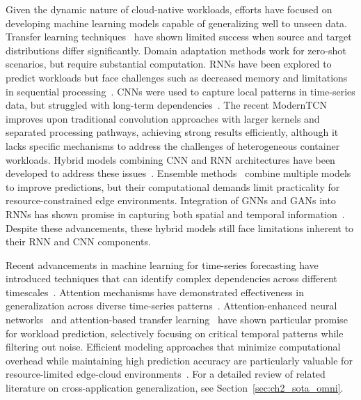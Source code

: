Given the dynamic nature of cloud-native workloads, efforts have focused on developing machine learning models capable of generalizing well to unseen data. Transfer learning techniques~\cite{wang2019transfer} have shown limited success when source and target distributions differ significantly. Domain adaptation methods work for zero-shot scenarios, but require substantial computation. \acp{RNN} have been explored to predict workloads but face challenges such as decreased memory and limitations in sequential processing~\cite{hochreiter1998vanishing, benidis2022deep}. \acp{CNN} were used to capture local patterns in time-series data, but struggled with long-term dependencies~\cite{acmtimeseriesreview2024}. The recent \ac{ModernTCN}~\cite{ModernTCN} improves upon traditional convolution approaches with larger kernels and separated processing pathways, achieving strong results efficiently, although it lacks specific mechanisms to address the challenges of heterogeneous container workloads. Hybrid models combining \ac{CNN} and \ac{RNN} architectures have been developed to address these issues~\cite{xu2022esdnn}. Ensemble methods~\cite{kim2024ensemble} combine multiple models to improve predictions, but their computational demands limit practicality for resource-constrained edge environments. Integration of \acp{GNN} and \acp{GAN} into \acp{RNN} has shown promise in capturing both spatial and temporal information~\cite{li2024evogwp, esteban2017real, AGCRN}. Despite these advancements, these hybrid models still face limitations inherent to their \ac{RNN} and \ac{CNN} components.

Recent advancements in machine learning for time-series forecasting have introduced techniques that can identify complex dependencies across different timescales~\cite{gort2024forecasting}. Attention mechanisms have demonstrated effectiveness in generalization across diverse time-series patterns~\cite{vaswani2017attention, wen2022transformers}. Attention-enhanced neural networks~\cite{zhang2022attention} and attention-based transfer learning~\cite{li2022robust} have shown particular promise for workload prediction, selectively focusing on critical temporal patterns while filtering out noise. Efficient modeling approaches that minimize computational overhead while maintaining high prediction accuracy are particularly valuable for resource-limited edge-cloud environments~\cite{fasterandlightertransformers, gorbett2023sparse, STRec}. For a detailed review of related literature on cross-application generalization, see Section~\ref{sec:ch2_sota_omni}.


